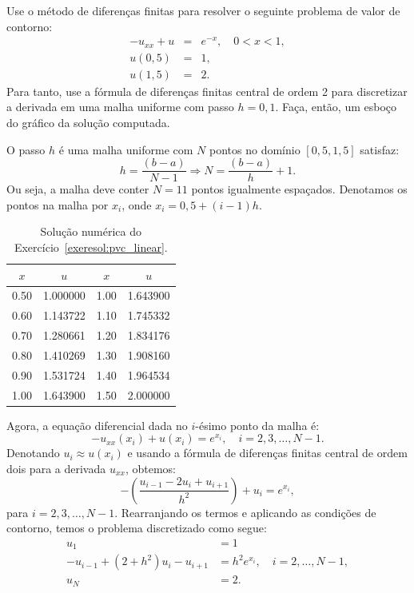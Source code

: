 \begin{exeresol}\label{exeresol:pvc_linear} Use o método de diferenças finitas para resolver o seguinte problema de valor de contorno:
  \begin{eqnarray}
    -u_{xx} + u  &=& e^{-x},\quad 0<x<1,\\
    u(0,5) &=& 1,\\
    u(1,5) &=& 2.
  \end{eqnarray}
Para tanto, use a fórmula de diferenças finitas central de ordem 2 para discretizar a derivada em uma malha uniforme com passo $h=0,1$. Faça, então, um esboço do gráfico da solução computada.
\end{exeresol}
\begin{resol}
O passo $h$ é uma malha uniforme com $N$ pontos no domínio $[0,5, 1,5]$ satisfaz:
\begin{equation}
  h = \frac{(b-a)}{N-1} \Rightarrow N = \frac{(b-a)}{h} + 1.
\end{equation}
Ou seja, a malha deve conter $N = 11$ pontos igualmente espaçados. Denotamos os pontos na malha por $x_i$, onde $x_i = 0,5 + (i-1)h$.

\begin{table}
  \centering
  \begin{tabular}{cc|cc}
    $x$ & $u$ & $x$ & $u$\\\hline
0.50 & 1.000000 & 1.00 & 1.643900 \\
0.60 & 1.143722 & 1.10 & 1.745332 \\
0.70 & 1.280661 & 1.20 & 1.834176 \\
0.80 & 1.410269 & 1.30 & 1.908160 \\
0.90 & 1.531724 & 1.40 & 1.964534 \\
1.00 & 1.643900 & 1.50 & 2.000000 \\\hline
  \end{tabular}
  \caption{Solução numérica do Exercício~\ref{exeresol:pvc_linear}.}
  \label{tab:exeresol_pvc_linear}
\end{table}

Agora, a equação diferencial dada no $i$-ésimo ponto da malha é:
\begin{equation}
  -u_{xx}(x_i) + u(x_i) = e^{x_i},\quad i = 2, 3, \dotsc, N-1.
\end{equation}
Denotando $u_i \approx u(x_i)$ e usando a fórmula de diferenças finitas central de ordem dois para a derivada $u_{xx}$, obtemos:
\begin{equation}
  -\left(\frac{u_{i-1} - 2u_i + u_{i+1}}{h^2}\right) + u_i = e^{x_i},
\end{equation}
para $i= 2, 3, \dotsc, N-1$. Rearranjando os termos e aplicando as condições de contorno, temos o problema discretizado como segue:
\begin{equation}
  \begin{split}
    u_1 &= 1\\
    -u_{i-1} + (2 + h^2)u_i - u_{i+1} &= h^2e^{x_i},\quad i=2 ,\dotsc, N-1,\\
    u_N &= 2.
  \end{split}
\end{equation}


\end{resol}
